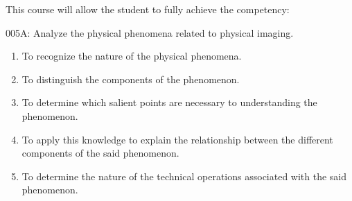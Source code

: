 {This course will allow the student to fully achieve the competency:

005A: Analyze the physical phenomena related to physical imaging.
\begin{enumerate}
\item To recognize the nature of the physical phenomena.
\item To distinguish the components of the phenomenon.
\item To determine which salient points are necessary to understanding the phenomenon.
\item To apply this knowledge to explain the relationship between the different components of the said  phenomenon.
\item To determine the nature of the technical operations associated with the said phenomenon. 
\end{enumerate}
}